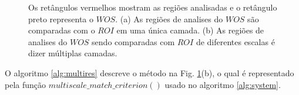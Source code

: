 \begin{figure}[H]
\centering
  \caption{Os retângulos vermelhos mostram as regiões analisadas e o retângulo preto representa o $WOS$. 
  (a) As regiões de analises do $WOS$ são comparadas com o $ROI$ em uma única camada. 
  (b) As regiões de analises do $WOS$ sendo comparadas com $ROI$ de diferentes escalas é dizer múltiplas camadas.}
  \label{fig:multires}
\end{figure}

O algoritmo \ref{alg:multires} descreve o método na Fig. \ref{fig:multires}(b), o qual
é representado pela função $multiscale\_match\_criterion()$ usado no algoritmo \ref{alg:system}.


